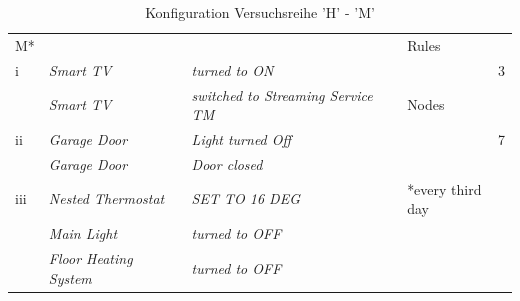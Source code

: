 \begin{table}[]
{\begin{tabular}{llll}
M*            & \textit{}                     & \textit{}                                 & Rules                     \\
i             & \textit{Smart TV}             & \textit{turned to ON}                     & \multicolumn{1}{r}{3}     \\
              & \textit{Smart TV}             & \textit{switched to Streaming Service TM} & Nodes                     \\
ii            & \textit{Garage Door}          & \textit{Light turned Off}                 & \multicolumn{1}{r}{7}     \\
              & \textit{Garage Door}          & \textit{Door closed}                      &                           \\
iii           & \textit{Nested Thermostat}    & \textit{SET TO 16 DEG}                    & *every third day          \\
              & \textit{Main Light}           & \textit{turned to OFF}                    &                           \\
              & \textit{Floor Heating System} & \textit{turned to OFF}                    &                           \\ \hline
			  \end{tabular}%
}
\caption{Konfiguration Versuchsreihe 'H' - 'M'}
\label{tab:Versuchskonfig2}
\end{table}



\clearpage
